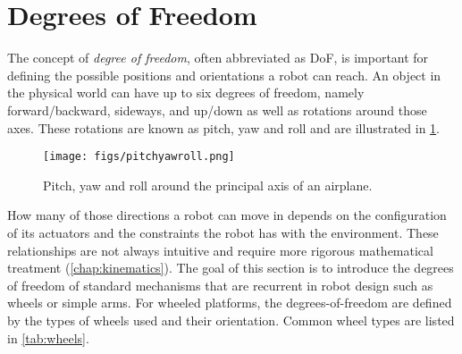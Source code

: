\section{Degrees of Freedom}\label{sec:dof}
The concept of \emph{degree of freedom}, often abbreviated as DoF, is important for defining the possible positions and orientations a robot can reach. An object in the physical world can have up to six  degrees of freedom, namely forward/backward, sideways, and up/down as well as rotations around those axes. These rotations are known as pitch, yaw and roll and are illustrated in \cref{fig:pitchyawandroll}. 

\begin{figure}
	\centering
		\texttt{[image: figs/pitchyawroll.png]}
	\caption{Pitch, yaw and roll around the principal axis of an airplane.}
	\label{fig:pitchyawandroll}
\end{figure}

How many of those directions a robot can move in depends on the configuration of its actuators and the constraints the robot has with the environment. These relationships are not always intuitive and require more rigorous mathematical treatment (\cref{chap:kinematics}). The goal of this section is to introduce the degrees of freedom of standard mechanisms that are recurrent in robot design such as wheels or simple arms. For wheeled platforms, the degrees-of-freedom are defined by the types of wheels used and their orientation. Common wheel types are listed in \cref{tab:wheels}.

